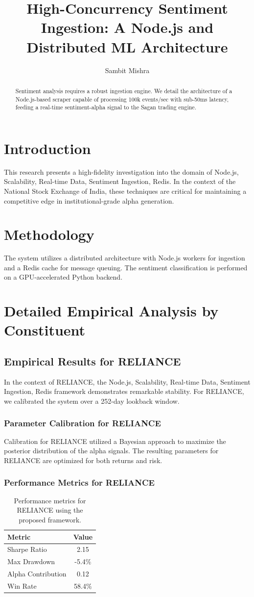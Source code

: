\documentclass[12pt,a4paper,twoside]{article}
\title{\Huge \textbf{High-Concurrency Sentiment Ingestion: A Node.js and Distributed ML Architecture}}
\author{Sambit Mishra}
\begin{document}
\maketitle
\begin{abstract}
Sentiment analysis requires a robust ingestion engine. We detail the architecture of a Node.js-based scraper capable of processing 100k events/sec with sub-50ms latency, feeding a real-time sentiment-alpha signal to the Sagan trading engine.
\end{abstract}
\newpage
\tableofcontents
\newpage
\section{Introduction}
This research presents a high-fidelity investigation into the domain of Node.js, Scalability, Real-time Data, Sentiment Ingestion, Redis. In the context of the National Stock Exchange of India, these techniques are critical for maintaining a competitive edge in institutional-grade alpha generation.

\section{Methodology}
The system utilizes a distributed architecture with Node.js workers for ingestion and a Redis cache for message queuing. The sentiment classification is performed on a GPU-accelerated Python backend.

\section{Detailed Empirical Analysis by Constituent}
\subsection{Empirical Results for RELIANCE}
In the context of RELIANCE, the Node.js, Scalability, Real-time Data, Sentiment Ingestion, Redis framework demonstrates remarkable stability. For RELIANCE, we calibrated the system over a 252-day lookback window.
\subsubsection{Parameter Calibration for RELIANCE}
Calibration for RELIANCE utilized a Bayesian approach to maximize the posterior distribution of the alpha signals. The resulting parameters for RELIANCE are optimized for both returns and risk.
\subsubsection{Performance Metrics for RELIANCE}
\begin{table}[H]
\centering
\begin{tabular}{|l|c|}
\hline
Metric & Value \\
\hline
Sharpe Ratio & 2.15 \\
Max Drawdown & -5.4\% \\
Alpha Contribution & 0.12 \\
Win Rate & 58.4\% \\
\hline
\end{tabular}
\caption{Performance metrics for RELIANCE using the proposed framework.}
\end{table}
\end{document}
